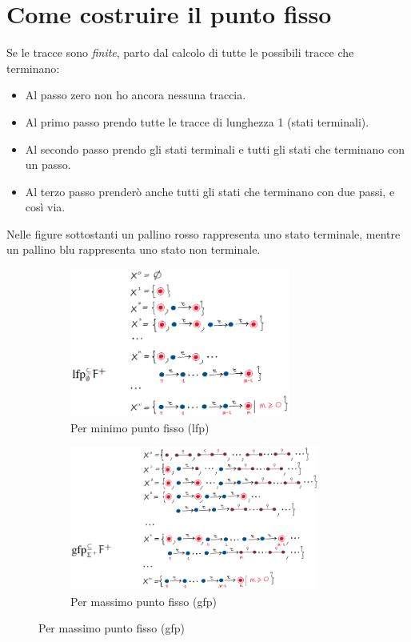 \documentclass[a4paper,oneside,titlepage]{book}
\begin{document}
\section{Come costruire il punto fisso}
Se le tracce sono \textit{finite}, parto dal calcolo di tutte le possibili tracce che terminano:
\begin{itemize}
    \item Al passo zero non ho ancora nessuna traccia.
    \item Al primo passo prendo tutte le tracce di lunghezza 1 (stati terminali).
    \item Al secondo passo prendo gli stati terminali e tutti gli stati che terminano con un passo.
    \item Al terzo passo prenderò anche tutti gli stati che terminano con due passi, e così via.
\end{itemize}
Nelle figure sottostanti un pallino rosso rappresenta uno stato terminale, mentre un pallino blu rappresenta uno stato non terminale.
\begin{figure}[htp]
	\begin{subfigure}{0.49\textwidth}
	    \centering
		\includegraphics[width=0.8\textwidth]{fp1.png} 
		\caption{Per minimo punto fisso (lfp)}
	\end{subfigure}
	\hfill
	\begin{subfigure}{0.49\textwidth}
	    \centering
		\includegraphics[width=0.9\textwidth]{fp2.png} 
		\caption{Per massimo punto fisso (gfp)}
	\end{subfigure}
\end{figure}
\end{document}
